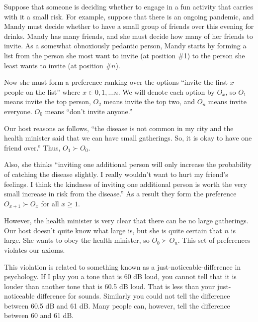 Suppose that someone is deciding whether to engage in a fun activity that carries with it a small risk.  For example, suppose that there is an ongoing pandemic, and Mandy must decide whether to have a small group of friends over this evening for drinks.  Mandy has many friends, and she must decide how many of her friends to invite.  As a somewhat obnoxiously pedantic person, Mandy starts by forming a list from the person she most want to invite (at position \#1) to the person she least wants to invite (at position \#$n$). 

Now she must form a preference ranking over the options ``invite the first $x$ people on the list'' where $x \in {0, 1, \dots n}$.  We will denote each option by $O_x$, so $O_1$ means invite the top person, $O_2$ means invite the top two, and $O_n$ means invite everyone.  $O_0$ means ``don't invite anyone.''

Our host reasons as follows, ``the disease is not common in my city and the health minister said that we can have small gatherings.  So, it is okay to have one friend over.'' Thus, $O_1 \succ O_0 $.

Also, she thinks ``inviting one additional person will only increase the probability of catching the disease slightly. I really wouldn't want to hurt my friend's feelings. I think the kindness of inviting one additional person is worth the very small increase in risk from the disease.''  As a result they form the preference $O_{x + 1} \succ O_x$ for all $x \geq 1$.


However, the health minister is very clear that there can be no large gatherings.  Our host doesn't quite know what large is, but she is quite certain that $n$ is large. She wants to obey the health minister, so $O_0 \succ O_n$. This set of preferences violates our axioms.

This violation is related to something known as a just-noticeable-difference in psychology.  If I play you a tone that is 60 dB loud, you cannot tell that it is louder than another tone that is 60.5 dB loud.  That is less than your just-noticeable difference for sounds.  Similarly you could not tell the difference between 60.5 dB and 61 dB.  Many people can, however, tell the difference between 60 and 61 dB.

